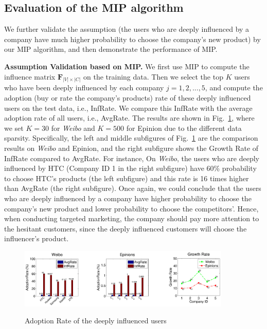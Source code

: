 \documentclass{llncs}
\begin{document}
\vspace*{-0.4cm}
\subsection{Evaluation of the MIP algorithm}
\vspace*{-0.3cm}
We further validate the assumption (the users who are deeply influenced by a company have much higher probability to choose the company's new product) by our MIP algorithm, and then demonstrate the performance of MIP.

\textbf{Assumption Validation based on MIP.} We first use MIP to compute the influence matrix $\mathbf{F}_{|V| \times |C|}$ on the training data. Then we select the top $K$ users who have been deeply influenced by each company $j=1,2,...,5$, and compute the adoption (buy or rate the company's products) rate of these deeply influenced users on the test data, i.e., InfRate. We compare this InfRate with the average adoption rate of all users, i.e., AvgRate. The results are shown in Fig.~\ref{fig:assumptionvalide}, where we set $K=30$ for \emph{Weibo} and $K=500$ for Epinion due to the different data sparsity. Specifically, the left and middle subfigures of Fig.~\ref{fig:assumptionvalide} are the comparison results on \emph{Weibo} and Epinion, and the right subfigure shows the Growth Rate of InfRate compared to AvgRate. For instance, On \emph{Weibo}, the users who are deeply influenced by HTC (Company ID 1 in the right subfigure) have 60\% probability to choose HTC's products (the left subfigure) and this rate is 16 times higher than AvgRate (the right subfigure). Once again, we could conclude that the users who are deeply influenced by a company have higher probability to choose the company's new product and lower probability to choose the competitors'. Hence, when conducting targeted marketing, the company should pay more attention to the hesitant customers, since the deeply influenced customers will choose the influencer's product.

\begin{figure}[htb]
  \centering
  \includegraphics[width=0.9\textwidth]{res/isu_b_f2.pdf}\\
  \vspace*{-0.65cm}
  \caption{Adoption Rate of the deeply influenced users}\label{fig:assumptionvalide}
 \vspace*{-0.15cm}
\end{figure}
\end{document}
